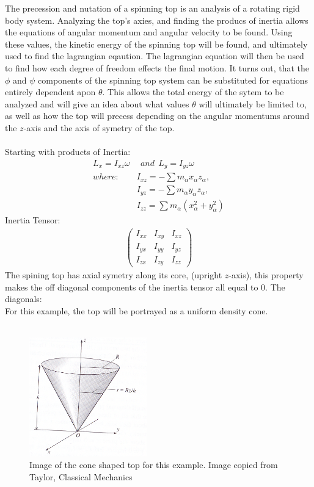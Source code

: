 \documentclass[a4paper,12pt]{article}
\begin{document}
The precession and nutation of a spinning top is an analysis of a rotating rigid body system. Analyzing the top's axies, and finding the producs of inertia allows the equations of angular momentum and angular velocity to be found.  Using these values, the kinetic energy of the spinning top will be found, and ultimately used to find the lagrangian eqaution.  The lagrangian equation will then be used to find how each degree of freedom effects the final motion.  It turns out, that the $\phi$ and $\psi$ components of the spinning top system can be substituted for equations entirely dependent apon $\theta$.  This allows the total energy of the sytem to be analyzed and will give an idea about what values $\theta$ will ultimately be limited to, as well as how the top will precess depending on the angular momentums around the $z$-axis and the axis of symetry of the top.
\\
\\
Starting with products of Inertia:
\begin{align*}
L_x=I_{xz}\omega&\ \ and\ \ L_y=I_{yz}\omega\\
where:\ \ &I_{xz}=-\sum m_\alpha x_\alpha z_\alpha,\\
&I_{yz}=-\sum m_\alpha y_\alpha z_\alpha,\\
&I_{zz}=\sum m_\alpha(x_\alpha^2+y_\alpha^2)
\end{align*}
Inertia Tensor:
\begin{align*}
\left( \begin{array}{ccc}
I_{xx} & I_{xy} & I_{xz}\\
I_{yx} & I_{yy} & I_{yz}\\
I_{zx} & I_{zy} & I_{zz} \end{array} \right)
\end{align*}
The spining top has axial symetry along its core, (upright $z$-axis), this property makes the off diagonal components of the inertia tensor all equal to 0.
The diagonals:
\\
For this example, the top will be portrayed as a uniform density cone.\\
\\
\begin{figure}[h!]
\centering
\includegraphics*[width=2in]{Taylor_Cone.png}
\caption{Image of the cone shaped top for this example.  Image copied from Taylor, Classical Mechanics}
\end{figure}
\end{document}
